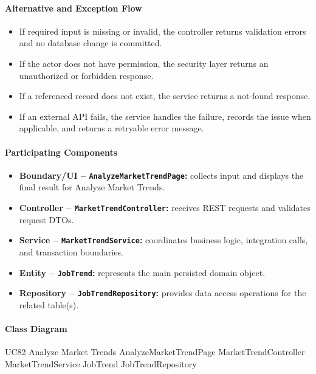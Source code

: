 \paragraph{Alternative and Exception Flow}

\begin{itemize}
    \item If required input is missing or invalid, the controller returns validation errors and no database change is committed.
    \item If the actor does not have permission, the security layer returns an unauthorized or forbidden response.
    \item If a referenced record does not exist, the service returns a not-found response.
    \item If an external API fails, the service handles the failure, records the issue when applicable, and returns a retryable error message.
\end{itemize}

\paragraph{Participating Components}

\begin{itemize}
    \item \textbf{Boundary/UI -- \texttt{AnalyzeMarketTrendPage}:} collects input and displays the final result for Analyze Market Trends.
    \item \textbf{Controller -- \texttt{MarketTrendController}:} receives REST requests and validates request DTOs.
    \item \textbf{Service -- \texttt{MarketTrendService}:} coordinates business logic, integration calls, and transaction boundaries.
    \item \textbf{Entity -- \texttt{JobTrend}:} represents the main persisted domain object.
    \item \textbf{Repository -- \texttt{JobTrendRepository}:} provides data access operations for the related table(s).
\end{itemize}

\paragraph{Class Diagram}

\ClassDiagram
{UC82 Analyze Market Trends}
{AnalyzeMarketTrendPage}
{MarketTrendController}
{MarketTrendService}
{JobTrend}
{JobTrendRepository}

